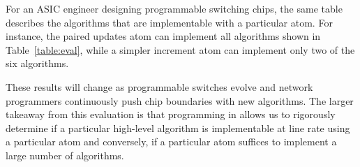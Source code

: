 For an ASIC engineer designing programmable switching chips, the same table
describes the algorithms that are implementable with a particular atom. For
instance, the paired updates atom can implement all algorithms shown in
Table~\ref{table:eval}, while a simpler increment atom can implement only
two of the six algorithms.

These results will change as programmable switches evolve and network
programmers continuously push chip boundaries with new algorithms.  The larger
takeaway from this evaluation is that programming in \pktlanguage allows us to
rigorously determine if a particular high-level algorithm is implementable at
line rate using a particular atom and conversely, if a particular atom suffices
to implement a large number of algorithms.
